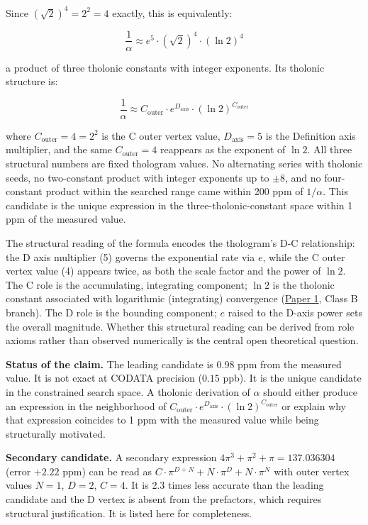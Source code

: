 \documentclass[
  11pt,
  letterpaper,
]{article}
\begin{document}
Since \((\sqrt{2})^4 = 2^2 = 4\) exactly, this is equivalently:

\[\frac{1}{\alpha} \approx e^5 \cdot (\sqrt{2})^4 \cdot (\ln 2)^4\]

a product of three tholonic constants with integer exponents. Its
tholonic structure is:

\[\frac{1}{\alpha} \approx C_{\text{outer}} \cdot e^{D_{\text{axis}}} \cdot (\ln 2)^{C_{\text{outer}}}\]

where \(C_{\text{outer}} = 4 = 2^2\) is the C outer vertex value,
\(D_{\text{axis}} = 5\) is the Definition axis multiplier, and the same
\(C_{\text{outer}} = 4\) reappears as the exponent of \(\ln 2\). All
three structural numbers are fixed thologram values. No alternating
series with tholonic seeds, no two-constant product with integer
exponents up to \(\pm 8\), and no four-constant product within the
searched range came within 200 ppm of \(1/\alpha\). This candidate is
the unique expression in the three-tholonic-constant space within 1 ppm
of the measured value.

The structural reading of the formula encodes the thologram's D-C
relationship: the D axis multiplier (5) governs the exponential rate via
\(e\), while the C outer vertex value (4) appears twice, as both the
scale factor and the power of \(\ln 2\). The C role is the accumulating,
integrating component; \(\ln 2\) is the tholonic constant associated
with logarithmic (integrating) convergence
(\href{https://github.com/baardev/truevalue/blob/main/docnav/Research/papers/1_recursive-tholonic-five-constants/1_recursive-tholonic-five-constants.pdf}{Paper
1}, Class B branch). The D role is the bounding component; \(e\) raised
to the D-axis power sets the overall magnitude. Whether this structural
reading can be derived from role axioms rather than observed numerically
is the central open theoretical question.

\textbf{Status of the claim.} The leading candidate is 0.98 ppm from the
measured value. It is not exact at CODATA precision (\(0.15\) ppb). It
is the unique candidate in the constrained search space. A tholonic
derivation of \(\alpha\) should either produce an expression in the
neighborhood of
\(C_{\text{outer}} \cdot e^{D_{\text{axis}}} \cdot (\ln 2)^{C_{\text{outer}}}\)
or explain why that expression coincides to 1 ppm with the measured
value while being structurally motivated.

\textbf{Secondary candidate.} A secondary expression
\(4\pi^3 + \pi^2 + \pi = 137.036304\) (error \(+2.22\) ppm) can be read
as \(C \cdot \pi^{D+N} + N \cdot \pi^D + N \cdot \pi^N\) with outer
vertex values \(N = 1\), \(D = 2\), \(C = 4\). It is 2.3 times less
accurate than the leading candidate and the D vertex is absent from the
prefactors, which requires structural justification. It is listed here
for completeness.
\end{document}
